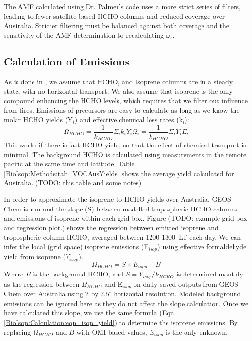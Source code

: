    The AMF calculated using Dr. Palmer's code uses a more strict series of filters, leading to fewer satellite based HCHO columns and reduced coverage over Australia.
    Stricter filtering must be balanced against both coverage and the sensitivity of the AMF determination to recalculating $\omega_z$.
    
  \subsection{Calculation of Emissions}
    \label{BioIsop:Calculation}
   
    As is done in \citet{Palmer2003, Millet2006, Bauwens2016}, we assume that HCHO, and Isoprene columns are in a steady state, with no horizontal transport.
    We also assume that isoprene is the only compound enhancing the HCHO levels, which requires that we filter out influence from fires.
    Emissions of precursors are easy to calculate as long as we know the molar HCHO yields (Y$_i$) and effective chemical loss rates (k$_i$):
    \begin{equation}
    \Omega_{HCHO} = \frac{1}{k_{HCHO}}\Sigma_i k_i Y_i \Omega_i = \frac{1}{k_{HCHO}}\Sigma_i Y_i E_i
    \end{equation}
    This works if there is fast HCHO yield, so that the effect of chemical transport is minimal.
    The background HCHO is calculated using measurements in the remote pacific at the same time and latitude.
    Table \ref{BioIsop:Methods:tab_VOCAusYields} shows the average yield calculated for Australia. (TODO: this table and some notes)
    
    In order to approximate the isoprene to HCHO yields over Australia, GEOS-Chem is run and the slope (S) between modelled tropospheric HCHO columns and emissions of isoprene within each grid box. 
    Figure (TODO: example grid box and regression plot.) shows the regression between emitted isoprene and tropospheric column HCHO, averaged between 1200-1300~LT each day.
    We can infer the local (grid space) isoprene emissions (E$_{isop}$) using effective formaldehyde yield from isoprene ($Y_{isop}$).
    \begin{equation} \label{BioIsop:Calculation:eqn_isop_yield}
    \Omega_{HCHO} = S \times E_{isop} + B
    \end{equation}
    Where \textit{B} is the background HCHO, and $S = Y_{isop}/k_{HCHO}$ is determined monthly as the regression between $\Omega_{HCHO}$ and E$_{isop}$ on daily saved outputs from GEOS-Chem over Australia using 2 by 2.5$^{\circ}$ horizontal resolution. 
    Modeled background emissions can be ignored here as they do not affect the slope calculation.
    Once we have calculated this slope, we use the same formula (Eqn. \ref{BioIsop:Calculation:eqn_isop_yield}) to determine the isoprene emissions.
    By replacing $\Omega_{HCHO}$ and $B$ with OMI based values, $E_{isop}$ is the only unknown.
    
